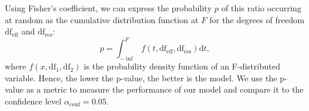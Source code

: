 Using Fisher's coefficient, we can express the probability $p$ of this ratio occurring at random as the cumulative distribution function at $F$ for the degrees of freedom $\text{df}_\text{eff}$ and $\text{df}_\text{res}$:
\begin{equation}
	p = \int_{-\inf}^F f(t,\text{df}_\text{eff},\text{df}_\text{res}) \mathrm{d}t,
\end{equation}
where $f(x,\text{df}_1,\text{df}_2)$ is the probability density function of an F-distributed variable. Hence, the lower the p-value, the better is the model. We use the p-value as a metric to measure the performance of our model and compare it to the confidence level $\alpha_\text{conf} = 0.05$.
